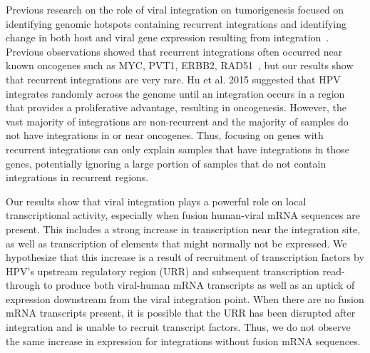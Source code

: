 \documentclass[10pt]{article}
\begin{document}
Previous research on the role of viral integration on tumorigenesis focused on identifying genomic hotspots containing recurrent integrations and identifying change in both host and viral gene expression resulting from integration~\cite{Tang2013,Lawrence2015,Hu2015,Zhang2016}.  Previous observations showed that recurrent integrations often occurred near known oncogenes such as MYC, PVT1, ERBB2, RAD51~\cite{Tang2013}, but our results show that recurrent integrations are very rare.  Hu et al. 2015 suggested that HPV integrates randomly across the genome until an integration occurs in a region that provides a proliferative advantage, resulting in oncogenesis.  However, the vast majority of integrations are non-recurrent and the majority of samples do not have integrations in or near oncogenes.  Thus, focusing on genes with recurrent integrations can only explain samples that have integrations in those genes, potentially ignoring a large portion of samples that do not contain integrations in recurrent regions.

Our results show that viral integration plays a powerful role on local transcriptional activity, especially when fusion human-viral mRNA sequences are present.  This includes a strong increase in transcription near the integration site, as well as transcription of elements that might normally not be expressed.  We hypothesize that this increase is a result of recruitment of transcription factors by HPV's upstream regulatory region (URR) and subsequent transcription read-through to produce both viral-human mRNA transcripts as well as an uptick of expression downstream from the viral integration point.  When there are no fusion mRNA transcripts present, it is possible that the URR has been disrupted after integration and is unable to recruit transcript factors.  Thus, we do not observe the same increase in expression for integrations without fusion mRNA sequences.
\end{document}
